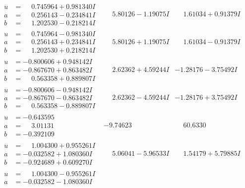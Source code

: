 \documentclass[1p]{elsarticle_modified}
\theoremstyle{definition}
\begin{document}
$$\begin{array}{c|c|c}
\begin{aligned}
u &= \phantom{-}0.745964 + 0.981340 I \\
a &= \phantom{-}0.256143 - 0.234841 I \\
b &= \phantom{-}1.202530 - 0.218214 I\end{aligned}
 & \phantom{-}5.80126 - 1.19075 I & \phantom{-}1.61034 + 0.91379 I \\ \hline\begin{aligned}
u &= \phantom{-}0.745964 - 0.981340 I \\
a &= \phantom{-}0.256143 + 0.234841 I \\
b &= \phantom{-}1.202530 + 0.218214 I\end{aligned}
 & \phantom{-}5.80126 + 1.19075 I & \phantom{-}1.61034 - 0.91379 I \\ \hline\begin{aligned}
u &= -0.800606 + 0.948142 I \\
a &= -0.867670 + 0.863482 I \\
b &= \phantom{-}0.563358 + 0.889807 I\end{aligned}
 & \phantom{-}2.62362 + 4.59244 I & -1.28176 - 3.75492 I \\ \hline\begin{aligned}
u &= -0.800606 - 0.948142 I \\
a &= -0.867670 - 0.863482 I \\
b &= \phantom{-}0.563358 - 0.889807 I\end{aligned}
 & \phantom{-}2.62362 - 4.59244 I & -1.28176 + 3.75492 I \\ \hline\begin{aligned}
u &= -0.643595\phantom{ +0.000000I} \\
a &= \phantom{-}3.01131\phantom{ +0.000000I} \\
b &= -0.392109\phantom{ +0.000000I}\end{aligned}
 & -9.74623\phantom{ +0.000000I} & \phantom{-}60.6330\phantom{ +0.000000I} \\ \hline\begin{aligned}
u &= \phantom{-}1.004300 + 0.955261 I \\
a &= -0.032582 + 1.080360 I \\
b &= -0.924689 + 0.609270 I\end{aligned}
 & \phantom{-}5.06041 - 5.96533 I & \phantom{-}1.54179 + 5.79885 I \\ \hline\begin{aligned}
u &= \phantom{-}1.004300 - 0.955261 I \\
a &= -0.032582 - 1.080360 I \\

\end{aligned}
\end{array}$$
\end{document}
